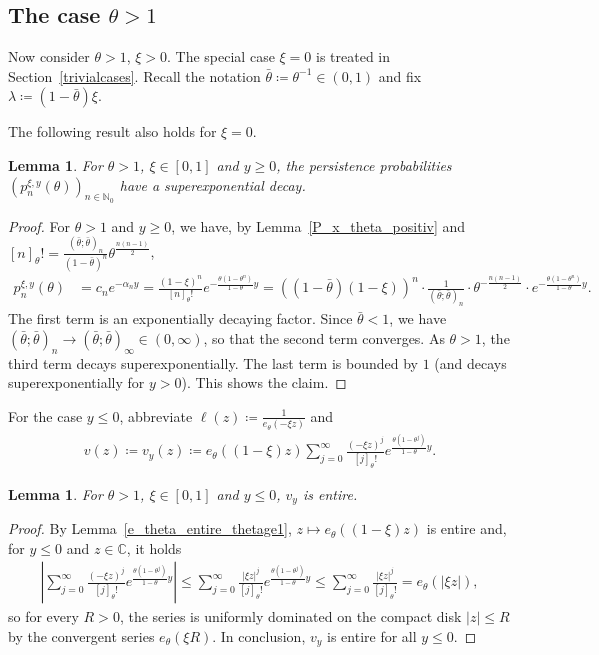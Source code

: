 \documentclass[12pt]{article}
\newcommand{\N}{\mathbb{N}} %
\newcommand{\C}{\mathbb{C}} %
\newcommand{\1}{\mathds{1}}
\theoremstyle{definition}
\theoremstyle{plain}
\newtheorem{Lemma}[definition]{Lemma}
\theoremstyle{remark}
\begin{document}
\subsection{The case \texorpdfstring{$\theta>1$}{theta>1}}\label{sec_thetage1}
Now consider $\theta >1$, $\xi>0$. The special case $\xi=0$ is treated in Section~\ref{trivialcases}. Recall the notation $\bar\theta\coloneqq\theta^{-1}\in(0,1)$ and fix $\lambda\coloneqq (1-\bar\theta)\xi$. 

The following result also holds for $\xi=0$.
\begin{Lemma}\label{asymptotic_pos_theta_ge1_pos_y}
  For $\theta >1$, $\xi\in[0,1]$ and $y\ge0$, the persistence probabilities $\left(p_n^{\xi,y}(\theta)\right)_{n\in\N_0}$ have a superexponential decay.
 \end{Lemma}
\begin{proof}
For $\theta>1$ and $y\ge 0$, we have, by Lemma~\ref{P_x_theta_positiv} and $[n]_\theta!=\frac{(\bar\theta;\bar\theta)_n}{(1-\bar\theta)^n}\theta^{\frac{n(n-1)}{2}}$,
    \begin{align*}
        p_n^{\xi,y}(\theta)
        &=c_ne^{-\alpha_ny}
        =\frac{(1-\xi)^n}{[n]_\theta!}e^{-\frac{\theta(1-\theta^n)}{1-\theta}y}
       =((1-\bar\theta)(1-\xi))^n\cdot \frac{1}{(\bar\theta;\bar\theta)_n}\cdot \theta^{-\frac{n(n-1)}{2}}\cdot e^{-\frac{\theta(1-\theta^n)}{1-\theta}y}.
    \end{align*}
The first term is an exponentially decaying factor. Since $\bar\theta<1$, we have $(\bar\theta;\bar\theta)_n\to (\bar\theta;\bar\theta)_\infty\in(0,\infty)$, so that the second term converges. As $\theta>1$, the third term decays superexponentially. The last term is bounded by $1$ (and decays superexponentially for $y>0$). This shows the claim.
\end{proof}
For the case $y\le 0$, abbreviate $\ell(z)\coloneqq\frac{1}{e_\theta(-\xi z)}$ and
\begin{align*}
  v(z)\coloneqq  v_y(z)\coloneqq  e_\theta((1-\xi)z)\sum_{j=0}^\infty \frac{(-\xi z)^{j}}{[j]_\theta!}e^{\frac{\theta(1-\theta^j)}{1-\theta}y}.
\end{align*}
\begin{Lemma}\label{v_entire_thetage1}
   For $\theta>1$, $\xi\in[0,1]$ and $y\le0$,  $v_y$ is entire.
\end{Lemma}
\begin{proof}
    By Lemma~\ref{e_theta_entire_thetage1}, $z\mapsto e_\theta((1-\xi)z)$ is entire and, for $y\le 0$ and $z\in\C$, it holds
\begin{align*}
    \left|\sum_{j=0}^\infty \frac{(-\xi z)^{j}}{[j]_\theta!}e^{\frac{\theta(1-\theta^j)}{1-\theta}y}\right|
    \le\sum_{j=0}^\infty \frac{|\xi z|^{j}}{[j]_\theta!}e^{\frac{\theta(1-\theta^j)}{1-\theta}y}
     \le\sum_{j=0}^\infty \frac{|\xi z|^{j}}{[j]_\theta!}
     =e_\theta(|\xi z|),
\end{align*}
so for every $R>0$, the series is uniformly dominated on the compact disk $|z|\le R$ by the convergent series $e_\theta(\xi R)$. In conclusion, $v_y$ is entire for all $y\le 0$.
\end{proof}
\end{document}
